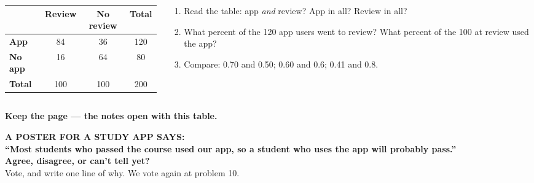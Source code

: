 \documentclass[aspectratio=169, 11pt]{beamer}
\begin{document}
\begin{frame}[t, plain]
  \begin{columns}[t]
    \begin{column}{0.46\textwidth}
      \begin{center}
      \renewcommand{\arraystretch}{1.3}
      \begin{tabular}{l c c c}
      \hline
       & \textbf{Review} & \textbf{No review} & \textbf{Total} \\
      \hline
      \textbf{App} & 84 & 36 & 120 \\
      \textbf{No app} & 16 & 64 & 80 \\
      \textbf{Total} & 100 & 100 & 200 \\
      \hline
      \end{tabular}
      \end{center}
    \end{column}
    \begin{column}{0.5\textwidth}
      \begin{enumerate}\setlength{\itemsep}{6pt}
        \item Read the table: app \emph{and} review? App in all? Review in all?
        \item What percent of the 120 app users went to review? What percent of the 100 at review
              used the app?
        \item Compare: 0.70 and 0.50; 0.60 and 0.6; 0.41 and 0.8.
      \end{enumerate}
    \end{column}
  \end{columns}
  \vspace{0.3cm}
  \begin{center}
    {\color{cerulean}\bfseries Keep the page --- the notes open with this table.}
  \end{center}
\end{frame}

{
\begin{frame}[plain]
  \vspace{1.1cm}
  \begin{center}
    {\color{frostmid}\bfseries\small A POSTER FOR A STUDY APP SAYS:}\\[0.7cm]
    {\color{white}\bfseries\Large ``Most students who passed the course used our app, so a student
    who uses the app will probably pass.''}\\[0.8cm]
    {\color{goldacc}\bfseries\large Agree, disagree, or can't tell yet?}\\[0.5cm]
    {\color{frostmid}\small Vote, and write one line of why. We vote again at problem 10.}
  \end{center}
\end{frame}
}
\end{document}
